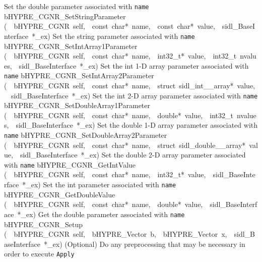 \documentclass{article}
\begin{document}
\begin{cxxentry}
\begin{cxxentry}
\begin{cxxnames}
        {
Set the double parameter associated with {\tt name}}
        {}
\label{cxx.10.4.21}
        {bHYPRE\_CGNR\_SetStringParameter}
        {(\ \ bHYPRE\_CGNR\ self,\ \ const\ char*\ name,\ \ const\ char*\ value,\ \ sidl\_BaseInterface\ *\_ex)}
        {
Set the string parameter associated with {\tt name}}
        {}
\label{cxx.10.4.22}
        {bHYPRE\_CGNR\_SetIntArray1Parameter}
        {(\ \ bHYPRE\_CGNR\ self,\ \ const\ char*\ name,\ \ int32\_t*\ value,\ \ int32\_t\ nvalues,\ \ sidl\_BaseInterface\ *\_ex)}
        {
Set the int 1-D array parameter associated with {\tt name}}
        {}
\label{cxx.10.4.23}
        {bHYPRE\_CGNR\_SetIntArray2Parameter}
        {(\ \ bHYPRE\_CGNR\ self,\ \ const\ char*\ name,\ \ struct\ sidl\_int\_\_array*\ value,\ \ sidl\_BaseInterface\ *\_ex)}
        {
Set the int 2-D array parameter associated with {\tt name}}
        {}
\label{cxx.10.4.24}
        {bHYPRE\_CGNR\_SetDoubleArray1Parameter}
        {(\ \ bHYPRE\_CGNR\ self,\ \ const\ char*\ name,\ \ double*\ value,\ \ int32\_t\ nvalues,\ \ sidl\_BaseInterface\ *\_ex)}
        {
Set the double 1-D array parameter associated with {\tt name}}
        {}
\label{cxx.10.4.25}
        {bHYPRE\_CGNR\_SetDoubleArray2Parameter}
        {(\ \ bHYPRE\_CGNR\ self,\ \ const\ char*\ name,\ \ struct\ sidl\_double\_\_array*\ value,\ \ sidl\_BaseInterface\ *\_ex)}
        {
Set the double 2-D array parameter associated with {\tt name}}
        {}
\label{cxx.10.4.26}
        {bHYPRE\_CGNR\_GetIntValue}
        {(\ \ bHYPRE\_CGNR\ self,\ \ const\ char*\ name,\ \ int32\_t*\ value,\ \ sidl\_BaseInterface\ *\_ex)}
        {
Set the int parameter associated with {\tt name}}
        {}
\label{cxx.10.4.27}
        {bHYPRE\_CGNR\_GetDoubleValue}
        {(\ \ bHYPRE\_CGNR\ self,\ \ const\ char*\ name,\ \ double*\ value,\ \ sidl\_BaseInterface\ *\_ex)}
        {
Get the double parameter associated with {\tt name}}
        {}
\label{cxx.10.4.28}
        {bHYPRE\_CGNR\_Setup}
        {(\ \ bHYPRE\_CGNR\ self,\ \ bHYPRE\_Vector\ b,\ \ bHYPRE\_Vector\ x,\ \ sidl\_BaseInterface\ *\_ex)}
        {
(Optional) Do any preprocessing that may be necessary in
order to execute {\tt Apply}}
        {}
\label{cxx.10.4.29}

\end{cxxnames}
\end{cxxentry}
\end{cxxentry}
\end{document}
